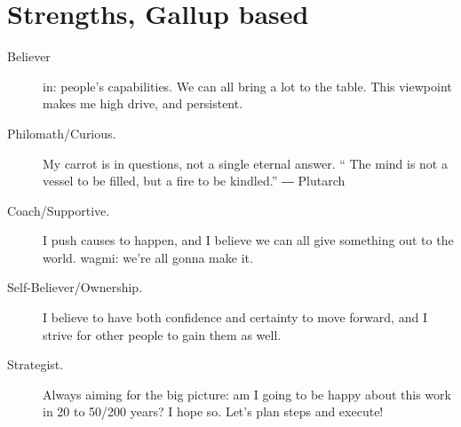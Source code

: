 \section*{Strengths, Gallup based}
\begin{description}
 \item[Believer] in:
 people's capabilities.
 We can all bring a lot to the table.
 This viewpoint makes me high drive, and persistent.
\item[Philomath/Curious.]
My carrot is in %
questions, not %
a single eternal answer.
``%
The mind is not a vessel to be filled, but a fire to be kindled.''
― Plutarch
\item[Coach/Supportive.] I push causes to happen, and I believe we can all give something out to the world. wagmi: we're all gonna make it.
\item[Self-Believer/Ownership.] I believe to have both confidence and certainty to move forward, and I strive for other people to gain them as well.
\item[Strategist.] Always aiming for the big picture: am I going to be happy about this work in 20 to 50/200 years? I hope so. Let's plan steps and execute!
 \end{description}

